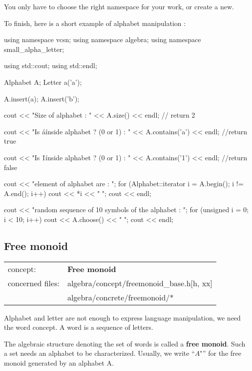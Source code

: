 \documentclass{article}
\begin{document}
You only have to choose the right namespace for your work, or create a new.

To finish, here is a short example of alphabet manipulation :

\begin{code}
  using namespace vcsn;
  using namespace algebra;
  using namespace small_alpha_letter;
  
  using std::cout;
  using std::endl;
  
  Alphabet A;
  Letter a('a');

  A.insert(a);
  A.insert('b');
  
  cout << "Size of alphabet : "
       << A.size() << endl;                // return 2
    
  cout << "Is \'a\' inside alphabet ? (0 or 1) : "
       << A.contains('a') << endl;         //return true

  cout << "Is \'1\' inside alphabet ? (0 or 1) : "
       << A.contains('1') << endl;         //return false
  
  cout << "element of alphabet are : ";
  for (Alphabet::iterator i = A.begin(); i != A.end(); i++)
    cout << *i << " ";
  cout << endl;
  
  cout << "random sequence of 10 symbols of the alphabet : ";
  for (unsigned i = 0; i < 10; i++)
    cout << A.choose() << " ";
  cout << endl;
\end{code}

\subsection{Free monoid}

\begin{tabular}%
{ll}
\hline 
concept: & \textbf{Free monoid}  \\
concerned files: & algebra/concept/freemonoid\_base.h[h, xx] \\
                 & algebra/concrete/freemonoid/* \\
\hline 
\end{tabular}

\hspace{1cm}

Alphabet and letter are not enough to express language manipulation,
we need the word concept. A word is a sequence of letters. 

The algebraic structure denoting the set of words is called a
\textbf{free monoid}. Such a set needs an alphabet to be
characterized. Usually, we write ``$A^{\star}$'' for the free monoid
generated by an alphabet A.
\end{document}
